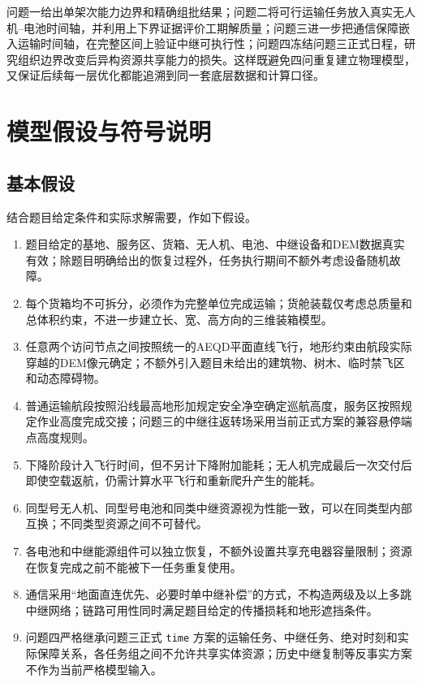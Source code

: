 \documentclass[UTF8,a4paper,12pt]{ctexart}
\begin{document}
问题一给出单架次能力边界和精确组批结果；问题二将可行运输任务放入真实无人机--电池时间轴，并利用上下界证据评价工期解质量；问题三进一步把通信保障嵌入运输时间轴，在完整区间上验证中继可执行性；问题四冻结问题三正式日程，研究组织边界改变后异构资源共享能力的损失。这样既避免四问重复建立物理模型，又保证后续每一层优化都能追溯到同一套底层数据和计算口径。

\section{模型假设与符号说明}
\label{sec:assumptions_symbols}

\subsection{基本假设}

结合题目给定条件和实际求解需要，作如下假设。

\begin{enumerate}[label=\textbf{假设\arabic*.},leftmargin=3.5em]
\item 题目给定的基地、服务区、货箱、无人机、电池、中继设备和DEM数据真实有效；除题目明确给出的恢复过程外，任务执行期间不额外考虑设备随机故障。
\item 每个货箱均不可拆分，必须作为完整单位完成运输；货舱装载仅考虑总质量和总体积约束，不进一步建立长、宽、高方向的三维装箱模型。
\item 任意两个访问节点之间按照统一的AEQD平面直线飞行，地形约束由航段实际穿越的DEM像元确定；不额外引入题目未给出的建筑物、树木、临时禁飞区和动态障碍物。
\item 普通运输航段按照沿线最高地形加规定安全净空确定巡航高度，服务区按照规定作业高度完成交接；问题三的中继往返转场采用当前正式方案的兼容悬停端点高度规则。
\item 下降阶段计入飞行时间，但不另计下降附加能耗；无人机完成最后一次交付后即使空载返航，仍需计算水平飞行和重新爬升产生的能耗。
\item 同型号无人机、同型号电池和同类中继资源视为性能一致，可以在同类型内部互换；不同类型资源之间不可替代。
\item 各电池和中继能源组件可以独立恢复，不额外设置共享充电器容量限制；资源在恢复完成之前不能被下一任务重复使用。
\item 通信采用“地面直连优先、必要时单中继补偿”的方式，不构造两级及以上多跳中继网络；链路可用性同时满足题目给定的传播损耗和地形遮挡条件。
\item 问题四严格继承问题三正式 \texttt{time} 方案的运输任务、中继任务、绝对时刻和实际保障关系，各任务组之间不允许共享实体资源；历史中继复制等反事实方案不作为当前严格模型输入。
\end{enumerate}
\end{document}
